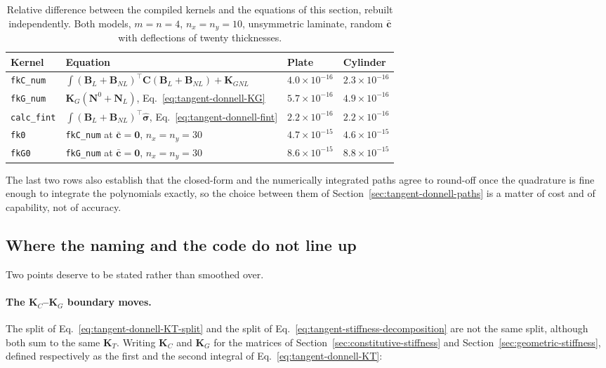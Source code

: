 \begin{table}[!htbp]
	\centering
	\caption[]{Relative difference between the compiled kernels and the equations of this section, rebuilt independently. Both models, $m = n = 4$, $n_x = n_y = 10$, unsymmetric laminate, random $\bar{\boldsymbol{c}}$ with deflections of twenty thicknesses.}
	\label{tab:tangent-donnell-checks}
	\renewcommand{\arraystretch}{1.3}
	\setlength{\tabcolsep}{4pt}
	\begin{tabular}{llll}
		\toprule
		Kernel & Equation & Plate & Cylinder \\
		\midrule
		\texttt{fkC\_num} & $\int (\boldsymbol{B}_L + \boldsymbol{B}_{NL})^\top \boldsymbol{C} (\boldsymbol{B}_L + \boldsymbol{B}_{NL}) + \boldsymbol{K}_{GNL}$ & $4.0 \times 10^{-16}$ & $2.3 \times 10^{-16}$ \\
		\texttt{fkG\_num} & $\boldsymbol{K}_G(\boldsymbol{N}^0 + \boldsymbol{N}_L)$, Eq.~\ref{eq:tangent-donnell-KG} & $5.7 \times 10^{-16}$ & $4.9 \times 10^{-16}$ \\
		\texttt{calc\_fint} & $\int (\boldsymbol{B}_L + \boldsymbol{B}_{NL})^\top \hat{\boldsymbol{\sigma}}$, Eq.~\ref{eq:tangent-donnell-fint} & $2.2 \times 10^{-16}$ & $2.2 \times 10^{-16}$ \\
		\texttt{fk0} & \texttt{fkC\_num} at $\bar{\boldsymbol{c}} = \boldsymbol{0}$, $n_x = n_y = 30$ & $4.7 \times 10^{-15}$ & $4.6 \times 10^{-15}$ \\
		\texttt{fkG0} & \texttt{fkG\_num} at $\bar{\boldsymbol{c}} = \boldsymbol{0}$, $n_x = n_y = 30$ & $8.6 \times 10^{-15}$ & $8.8 \times 10^{-15}$ \\
		\bottomrule
	\end{tabular}
\end{table}

The last two rows also establish that the closed-form and the numerically integrated paths agree to round-off once the quadrature is fine enough to integrate the polynomials exactly, so the choice between them of Section~\ref{sec:tangent-donnell-paths} is a matter of cost and of capability, not of accuracy.

\subsection{Where the naming and the code do not line up}\label{sec:tangent-donnell-discrepancies}

Two points deserve to be stated rather than smoothed over.

\paragraph{The $\boldsymbol{K}_C$--$\boldsymbol{K}_G$ boundary moves.} The split of Eq.~\ref{eq:tangent-donnell-KT-split} and the split of Eq.~\ref{eq:tangent-stiffness-decomposition} are not the same split, although both sum to the same $\boldsymbol{K}_T$. Writing $\boldsymbol{K}_C$ and $\boldsymbol{K}_G$ for the matrices of Section~\ref{sec:constitutive-stiffness} and Section~\ref{sec:geometric-stiffness}, defined respectively as the first and the second integral of Eq.~\ref{eq:tangent-donnell-KT}:

